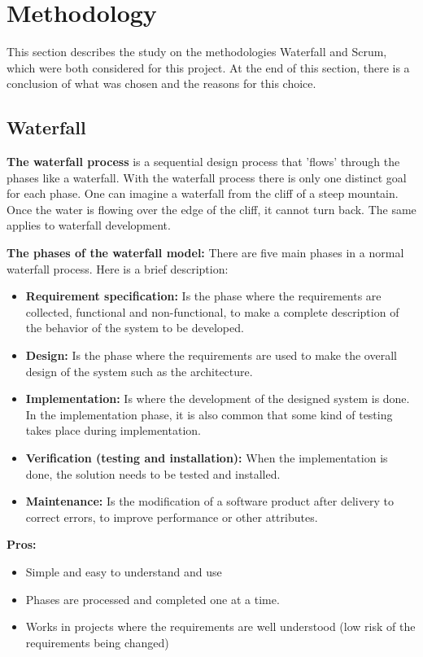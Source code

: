 \section{Methodology}
\label{sec:premethodology}

This section describes the study on the methodologies Waterfall and Scrum, which were both considered 
for this project. At the end of this section, there is a conclusion of what was chosen and the reasons for this choice.

\subsection{Waterfall}

{\bf The waterfall process } is a sequential design process that 'flows' through the phases like a waterfall.
With the waterfall process there is only one distinct goal for each phase. One can imagine a waterfall from the cliff of a steep mountain. Once the water is flowing over the edge of the cliff, it cannot turn back. The same applies to waterfall development. \cite{wikiWaterfall, techtargetWaterfall}

{\bf The phases of the waterfall model:} There are five main phases in a normal waterfall process. 
Here is a brief description:
\begin{itemize}
	\item {\bf Requirement specification:} Is the phase where the requirements are collected, functional and non-functional, to make a complete description of the behavior of the system to be developed.
	\item {\bf Design: } Is the phase where the requirements are used to make the overall design of the system such as the
	architecture.
	\item {\bf Implementation:} Is where the development of the designed system is done. In the implementation phase, 
	it is also common that some kind of testing takes place during implementation.
	\item {\bf Verification (testing and installation): } When the implementation is done, the solution needs to be tested and installed.
	\item {\bf Maintenance:} Is the modification of a software product after delivery to correct errors, to improve performance or other attributes.
\end{itemize}

{\bf Pros: }
\begin{itemize}
	\item Simple and easy to understand and use
	\item Phases are processed and completed one at a time.
	\item Works in projects where the requirements are well understood (low risk of the requirements being changed)
\end{itemize}

